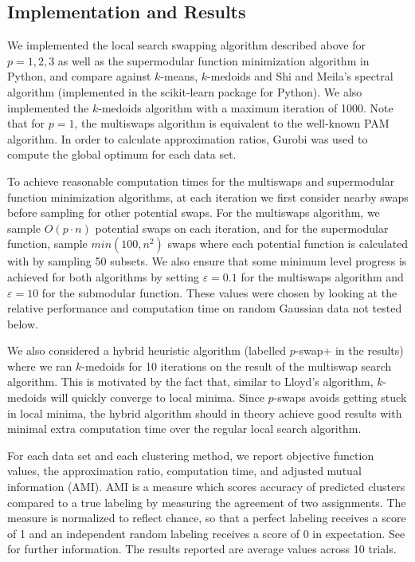 \documentclass{article}
\begin{document}
\subsection{Implementation and Results}

We implemented the local search swapping algorithm described above for $p=1, 2, 3$ as well as the supermodular function minimization algorithm in Python, and compare against $k$-means, $k$-medoids and Shi and Meila's spectral algorithm (implemented in the scikit-learn package for Python).  We also implemented the $k$-medoids algorithm with a maximum iteration of 1000. Note that for $p=1$, the multiswaps algorithm is equivalent to the well-known PAM algorithm.  In order to calculate approximation ratios, Gurobi was used to compute the global optimum for each data set.

To achieve reasonable computation times for the multiswaps and supermodular function minimization algorithms, at each iteration we first consider nearby swaps before sampling for other potential swaps. For the multiswaps algorithm, we sample $O(p\cdot n)$ potential swaps on each iteration, and for the supermodular function, sample $min(100,n^2)$ swaps where each potential function is calculated with by sampling 50 subsets. We also ensure that some minimum level progress is achieved for both algorithms by setting $\varepsilon = 0.1$ for the multiswaps algorithm and $\varepsilon = 10$ for the submodular function. These values were chosen by looking at the relative performance and computation time on random Gaussian data not tested below.   

We also considered a hybrid heuristic algorithm (labelled $p$-swap+ in the results) where we ran $k$-medoids for 10 iterations on the result of the multiswap search algorithm.  This is motivated by the fact that, similar to Lloyd's algorithm, $k$-medoids will quickly converge to local minima.  Since $p$-swaps avoids getting stuck in local minima, the hybrid algorithm should in theory achieve good results with minimal extra computation time over the regular local search algorithm.

For each data set and each clustering method, we report objective function values, the approximation ratio, computation time, and adjusted mutual information (AMI).  AMI is a measure which scores accuracy of predicted clusters compared to a true labeling by measuring the agreement of two assignments. The measure is normalized to reflect chance, so that a perfect labeling receives a score of 1 and an independent random labeling receives a score of 0 in expectation.  See \cite{Vinh} for further information.  The results reported are average values across 10 trials.
\end{document}
